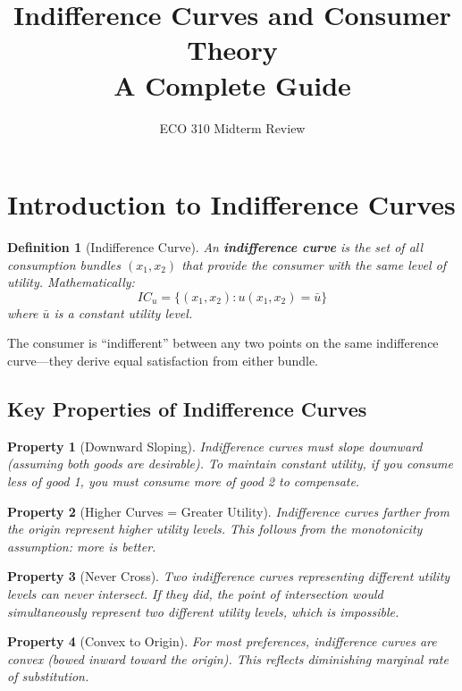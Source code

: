 \documentclass[11pt,a4paper]{article}
\title{\textbf{Indifference Curves and Consumer Theory}\\ \large A Complete Guide}
\author{ECO 310 Midterm Review}
\date{}
\newtheorem{definition}{Definition}
\newtheorem{property}{Property}
\begin{document}
\maketitle

\tableofcontents
\newpage

\section{Introduction to Indifference Curves}

\begin{definition}[Indifference Curve]
An \textbf{indifference curve} is the set of all consumption bundles $(x_1, x_2)$ that provide the consumer with the same level of utility. Mathematically:
\[
IC_u = \{(x_1, x_2) : u(x_1, x_2) = \bar{u}\}
\]
where $\bar{u}$ is a constant utility level.
\end{definition}

The consumer is ``indifferent'' between any two points on the same indifference curve---they derive equal satisfaction from either bundle.

\subsection{Key Properties of Indifference Curves}

\begin{property}[Downward Sloping]
Indifference curves must slope downward (assuming both goods are desirable). To maintain constant utility, if you consume less of good 1, you must consume more of good 2 to compensate.
\end{property}

\begin{property}[Higher Curves = Greater Utility]
Indifference curves farther from the origin represent higher utility levels. This follows from the \textit{monotonicity} assumption: more is better.
\end{property}

\begin{property}[Never Cross]
Two indifference curves representing different utility levels can never intersect. If they did, the point of intersection would simultaneously represent two different utility levels, which is impossible.
\end{property}

\begin{property}[Convex to Origin]
For most preferences, indifference curves are convex (bowed inward toward the origin). This reflects \textit{diminishing marginal rate of substitution}.
\end{property}
\end{document}
